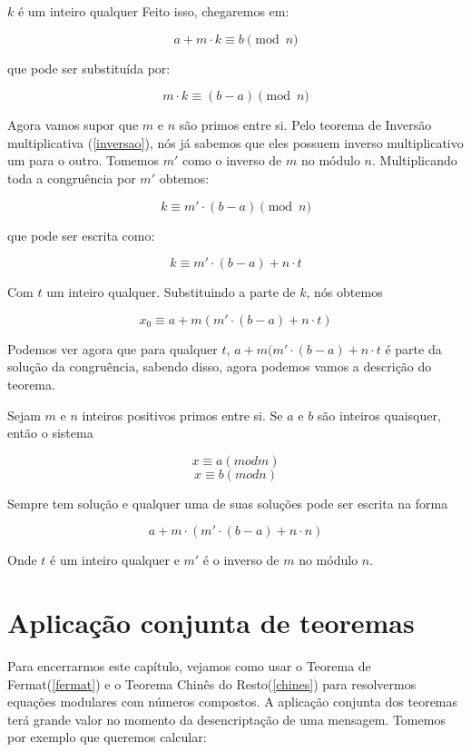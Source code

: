 $k$ \'e um inteiro qualquer Feito isso, chegaremos em:

$$a + m\cdot k \equiv b \pmod{n}$$

que pode ser substitu\'ida por:

$$ m\cdot k \equiv (b-a) \pmod{n}$$

Agora vamos supor que $m$ e $n$ s\~ao primos entre si. Pelo teorema de Invers\~ao multiplicativa (\ref{inversao}), n\'os j\'a sabemos que eles possuem inverso multiplicativo um para o outro. Tomemos $m'$ como o inverso de $m$ no m\'odulo $n$. Multiplicando toda a congru\^encia por $m'$ obtemos:

$$ k \equiv m'\cdot(b-a) \pmod{n}$$

que pode ser escrita como:

$$ k \equiv m'\cdot(b-a)+n \cdot t$$


Com $t$ um inteiro qualquer. Substituindo a parte de $k$, n\'os obtemos

$$ x_0 \equiv a + m (m'\cdot(b-a)+n \cdot t) $$


Podemos ver agora que para qualquer $t$, $a + m (m'\cdot(b-a)+n \cdot t$ \'e parte da solu\c{c}\~ao da congru\^encia, sabendo disso, agora podemos vamos a descri\c{c}\~ao do teorema.


\begin{Th}\label{chines}

Sejam $m$ e $n$ inteiros positivos primos entre si. Se $a$ e $b$ s\~ao inteiros quaisquer, ent\~ao o sistema

$$ x \equiv a (mod m) $$
$$ x \equiv b (mod n) $$

Sempre tem solu\c{c}\~ao e qualquer uma de suas solu\c{c}\~oes pode ser escrita na forma

$$ a + m \cdot(m' \cdot (b-a) + n \cdot n) $$

Onde $t$ \'e um inteiro qualquer e $m'$ \'e o inverso de $m$ no m\'odulo $n$.

\end{Th}

\section{Aplica\c{c}\~ao conjunta de teoremas}

Para encerrarmos este cap\'itulo, vejamos como usar o Teorema de Fermat(\ref{fermat}) e o Teorema Chin\^es do Resto(\ref{chines}) para resolvermos equa\c{c}\~oes modulares com n\'umeros compostos. A aplica\c{c}\~ao conjunta dos teoremas ter\'a grande valor no momento da desencripta\c{c}\~ao de uma mensagem. Tomemos por exemplo que queremos calcular:

